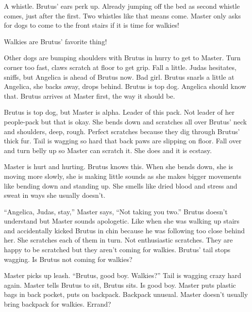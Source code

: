 





A whistle.  Brutus' ears perk up.   Already jumping off the bed as second whistle comes, just after the first.  Two whistles like that means come.  Master only asks for dogs to come to the front stairs if it is time for walkies!



Walkies are Brutus' favorite thing!



Other dogs are bumping shoulders with Brutus in hurry to get to Master.  Turn corner too fast, claws scratch at floor to get grip.  Fall a little.  Judas hesitates, sniffs, but Angelica is ahead of Brutus now.  Bad girl.  Brutus snarls a little at Angelica, she backs away, drops behind.  Brutus is top dog.  Angelica should know that.  Brutus arrives at Master first, the way it should be.



Brutus is top dog, but Master is alpha.  Leader of this pack.  Not leader of her people-pack but that is okay.  She bends down and scratches all over Brutus' neck and shoulders, deep, rough.  Perfect scratches because they dig through Brutus' thick fur.  Tail is wagging so hard that back paws are slipping on floor.  Fall over and turn belly up so Master can scratch it.  She does and it is ecstasy.



Master is hurt and hurting.  Brutus knows this.  When she bends down, she is moving more slowly, she is making little sounds as she makes bigger movements like bending down and standing up.  She smells like dried blood and stress and sweat in ways she usually doesn't.



``Angelica, Judas, stay,'' Master says, ``Not taking you two.'' Brutus doesn't understand but Master sounds apologetic.  Like when she was walking up stairs and accidentally kicked Brutus in chin because he was following too close behind her.  She scratches each of them in turn.  Not enthusiastic scratches.  They are happy to be scratched but they aren't coming for walkies.  Brutus' tail stops wagging.  Is Brutus not coming for walkies?



Master picks up leash.  ``Brutus, good boy.  Walkies?''  Tail is wagging crazy hard again.  Master tells Brutus to sit, Brutus sits.  Is good boy.  Master puts plastic bags in back pocket, puts on backpack.  Backpack unusual.  Master doesn't usually bring backpack for walkies.  Errand?



